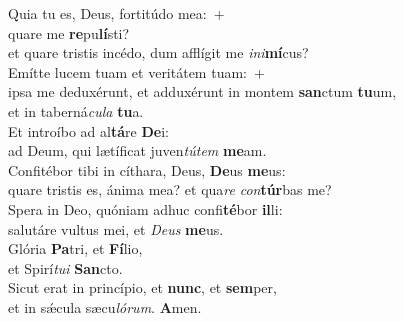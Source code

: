 \evenverse Quia tu es, Deus, fortitúdo mea:~+\\\evenverse  quare me \textbf{re}pu\textbf{lí}sti?~\*\\
\evenverse et quare tristis incédo, dum afflígit me \textit{i}\textit{ni}\textbf{mí}cus?\\
\oddverse Emítte lucem tuam et veritátem tuam:~+\\
\oddverse  ipsa me deduxérunt, et adduxérunt in montem \textbf{san}ctum \textbf{tu}um,~\*\\
\oddverse et in taberná\textit{cu}\textit{la} \textbf{tu}a.\\
\evenverse Et introíbo ad al\textbf{tá}re \textbf{De}i:~\*\\
\evenverse ad Deum, qui lætíficat juven\textit{tú}\textit{tem} \textbf{me}am.\\
\oddverse Confitébor tibi in cíthara, Deus, \textbf{De}us \textbf{me}us:~\*\\
\oddverse quare tristis es, ánima mea? et qua\textit{re} \textit{con}\textbf{túr}bas me?\\
\evenverse Spera in Deo, quóniam adhuc confi\textbf{té}bor \textbf{il}li:~\*\\
\evenverse salutáre vultus mei, et \textit{De}\textit{us} \textbf{me}us.\\
\oddverse Glória \textbf{Pa}tri, et \textbf{Fí}lio,~\*\\
\oddverse et Spirí\textit{tu}\textit{i} \textbf{San}cto.\\
\evenverse Sicut erat in princípio, et \textbf{nunc}, et \textbf{sem}per,~\*\\
\evenverse et in sǽcula sæcu\textit{ló}\textit{rum}. \textbf{A}men.\\

